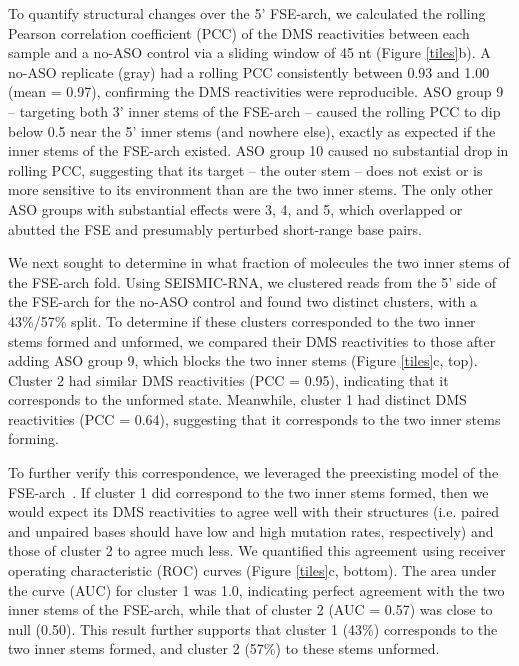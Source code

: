 \documentclass[main.tex]{subfiles}
\begin{document}
To quantify structural changes over the 5' FSE-arch, we calculated the rolling Pearson correlation coefficient (PCC) of the DMS reactivities between each sample and a no-ASO control via a sliding window of 45 nt (Figure \ref{tiles}b).
A no-ASO replicate (gray) had a rolling PCC consistently between 0.93 and 1.00 (mean = 0.97), confirming the DMS reactivities were reproducible.
ASO group 9 -- targeting both 3' inner stems of the FSE-arch -- caused the rolling PCC to dip below 0.5 near the 5' inner stems (and nowhere else), exactly as expected if the inner stems of the FSE-arch existed.
ASO group 10 caused no substantial drop in rolling PCC, suggesting that its target -- the outer stem -- does not exist or is more sensitive to its environment than are the two inner stems.
The only other ASO groups with substantial effects were 3, 4, and 5, which overlapped or abutted the FSE and presumably perturbed short-range base pairs.

We next sought to determine in what fraction of molecules the two inner stems of the FSE-arch fold.
Using SEISMIC-RNA, we clustered reads from the 5' side of the FSE-arch for the no-ASO control and found two distinct clusters, with a 43\%/57\% split.
To determine if these clusters corresponded to the two inner stems formed and unformed, we compared their DMS reactivities to those after adding ASO group 9, which blocks the two inner stems (Figure \ref{tiles}c, top).
Cluster 2 had similar DMS reactivities (PCC = 0.95), indicating that it corresponds to the unformed state.
Meanwhile, cluster 1 had distinct DMS reactivities (PCC = 0.64), suggesting that it corresponds to the two inner stems forming.

To further verify this correspondence, we leveraged the preexisting model of the FSE-arch~\cite{Ziv2020}.
If cluster 1 did correspond to the two inner stems formed, then we would expect its DMS reactivities to agree well with their structures (i.e. paired and unpaired bases should have low and high mutation rates, respectively) and those of cluster 2 to agree much less.
We quantified this agreement using receiver operating characteristic (ROC) curves (Figure \ref{tiles}c, bottom).
The area under the curve (AUC) for cluster 1 was 1.0, indicating perfect agreement with the two inner stems of the FSE-arch, while that of cluster 2 (AUC = 0.57) was close to null (0.50).
This result further supports that cluster 1 (43\%) corresponds to the two inner stems formed, and cluster 2 (57\%) to these stems unformed.
\end{document}
